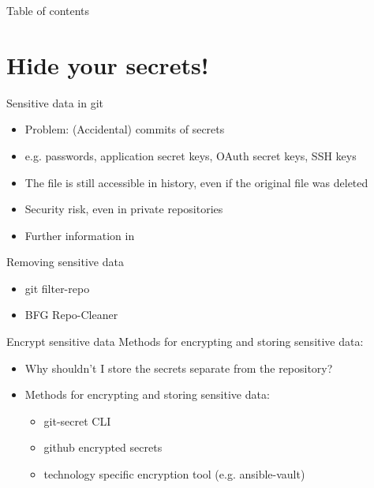 \documentclass[compress,aspectratio=169]{beamer}
\begin{document}
	\begin{frame}[plain]
		\titlepage
	\end{frame}

	\begin{frame}[t]{Table of contents}
		\tableofcontents[subsectionstyle=hide/hide]
	\end{frame}


	\section{Hide your secrets!}

		\begin{frame}{Sensitive data in git}
			\begin{itemize}
				\item Problem: (Accidental) commits of secrets
				\item e.g. passwords, application secret keys, OAuth secret keys, SSH keys
				\item The file is still accessible in history, even if the original file was deleted
				\item Security risk, even in private repositories
				\item Further information in \citep{github2023removing}
			\end{itemize}	
		\end{frame}

		\begin{frame}{Removing sensitive data}
			\begin{itemize}
				\item git filter-repo
				\item BFG Repo-Cleaner
			\end{itemize}
		\end{frame}
		
		\begin{frame}{Encrypt sensitive data}
			Methods for encrypting and storing sensitive data:
			\begin{itemize}
				\item 	Why shouldn't I store the secrets separate from the repository?
				\item 	Methods for encrypting and storing sensitive data:
						\begin{itemize}
							\item git-secret CLI 
							\item github encrypted secrets
							\item technology specific encryption tool (e.g. ansible-vault)
						\end{itemize}
			\end{itemize}
		\end{frame}
\end{document}
